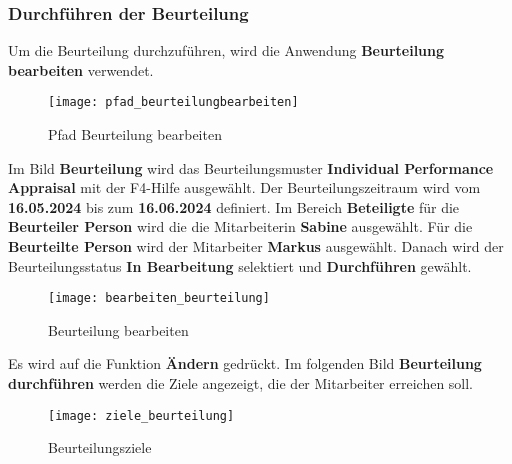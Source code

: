 \subsubsection{Durchführen der Beurteilung}
Um die Beurteilung durchzuführen, wird die Anwendung \textbf{Beurteilung bearbeiten} verwendet.
\begin{figure}[H]
	\centering
	\texttt{[image: pfad\_beurteilungbearbeiten]}
	\caption{Pfad Beurteilung bearbeiten}
	\label{fig:pfad_beurteilungbearbeiten}
\end{figure}
Im Bild \textbf{Beurteilung} wird das Beurteilungsmuster \textbf{Individual Performance Appraisal} mit der F4-Hilfe ausgewählt. Der Beurteilungszeitraum wird vom \textbf{16.05.2024} bis zum \textbf{16.06.2024} definiert. Im Bereich \textbf{Beteiligte} für die \textbf{Beurteiler Person} wird die die Mitarbeiterin \textbf{Sabine} ausgewählt. Für die \textbf{Beurteilte Person} wird der Mitarbeiter \textbf{Markus} ausgewählt. Danach wird der Beurteilungsstatus \textbf{In Bearbeitung} selektiert und \textbf{Durchführen} gewählt.
\begin{figure}[H]
	\centering
	\texttt{[image: bearbeiten\_beurteilung]}
	\caption{Beurteilung bearbeiten}
	\label{fig:bearbeiten_beurteilung}
\end{figure}
Es wird auf die Funktion \textbf{Ändern} gedrückt. Im folgenden Bild \textbf{Beurteilung durchführen} werden die Ziele angezeigt, die der Mitarbeiter erreichen soll.
\begin{figure}[H]
	\centering
	\texttt{[image: ziele\_beurteilung]}
	\caption{Beurteilungsziele}
	\label{fig:ziele_beurteilung}
\end{figure}

